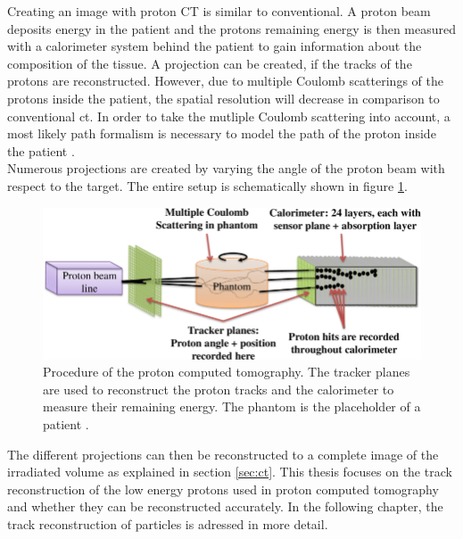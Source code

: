 Creating an image with proton CT is similar to conventional. A proton beam deposits energy in the patient and the
protons remaining energy is then measured with a calorimeter system behind the patient to gain information about the composition of the tissue. A projection can be created,
if the tracks of the protons are reconstructed. However, due to multiple Coulomb scatterings of the protons inside the patient, the spatial resolution will decrease in comparison
to conventional ct. In order to take the mutliple Coulomb scattering into account, a most likely path formalism is necessary to model the path of the proton inside the patient \cite{mlp}. \\
Numerous projections are created by varying the angle of the proton beam with respect to the target. The entire setup is schematically shown in figure \ref{fig:proton_ct}.

\begin{figure}
  \centering
  \includegraphics[height=0.35\textwidth]{images/proton_ct.png}
  \caption{Procedure of the proton computed tomography. The tracker planes are used to reconstruct the proton tracks and the calorimeter to measure their remaining energy.
  The phantom is the placeholder of a patient \cite{proton_ct}.}
  \label{fig:proton_ct}
\end{figure}

The different projections can then be reconstructed to a complete image of the irradiated volume as explained in section \ref{sec:ct}.
This thesis focuses on the track reconstruction of the low energy protons used in proton computed tomography and whether they can be reconstructed accurately.
In the following chapter, the track reconstruction of particles is adressed in more detail.
